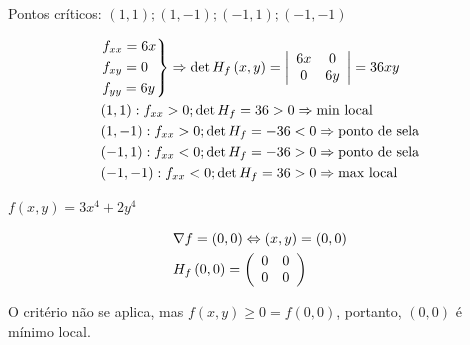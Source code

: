 \documentclass{book}
\begin{document}
\begin{sol}
    Pontos cr\'iticos: $\left( {1,1} \right);\left( {1, - 1} \right);\left( { - 1,1} \right);\left( { - 1, - 1} \right)$

\[
\begin{gathered}
\left. \begin{gathered}
f_{xx}  = 6x \hfill \\
f_{xy}  = 0 \hfill \\
f_{yy}  = 6y \hfill \\
\end{gathered}  \right\} \Rightarrow \det H_f \left( {x,y} \right) = \left| {\begin{array}{*{20}c}
{6x} & 0  \\
0 & {6y}  \\

\end{array} } \right| = 36xy \hfill \\
  \left( {1,1} \right):f_{xx}  > 0;\det H_f  = 36 > 0 \Rightarrow {\text{min local}} \hfill \\
  \left( {1, - 1} \right):f_{xx}  > 0;\det H_f  =  - 36 < 0 \Rightarrow {\text{ponto de sela}} \hfill \\
  \left( { - 1,1} \right):f_{xx}  < 0;\det H_f  =  - 36 > 0 \Rightarrow {\text{ponto de sela}} \hfill \\
  \left( { - 1, - 1} \right):f_{xx}  < 0;\det H_f  = 36 > 0 \Rightarrow {\text{max local}} \hfill \\
\end{gathered}
\]

\end{sol}

\newpage 

\begin{ex}
$f\left( {x,y} \right) = 3x^4  + 2y^4$
\end{ex}

\begin{sol}
\[
\begin{gathered}
  \nabla f = \left( {0,0} \right) \Leftrightarrow \left( {x,y} \right) = \left( {0,0} \right) \hfill \\
H_f \left( {0,0} \right) = \left( {\begin{array}{*{20}c}
0 & 0  \\
0 & 0  \\

\end{array} } \right) \hfill \\
\end{gathered}
\]

    O crit\'erio n\~ao se aplica, mas $f\left( {x,y} \right) \geqslant 0 = f\left( {0,0} \right)$, portanto, $\left( {0,0} \right)$ \'e m\'inimo local.
\end{sol}
\end{document}

